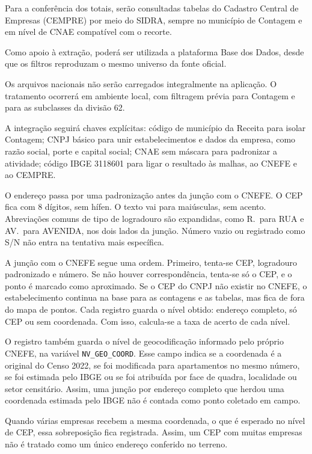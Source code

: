 Para a conferência dos totais, serão consultadas tabelas do Cadastro Central de Empresas (CEMPRE) por meio do SIDRA, sempre no município de Contagem e em nível de CNAE compatível com o recorte.

Como apoio à extração, poderá ser utilizada a plataforma Base dos Dados, desde que os filtros reproduzam o mesmo universo da fonte oficial.

Os arquivos nacionais não serão carregados integralmente na aplicação.
O tratamento ocorrerá em ambiente local, com filtragem prévia para Contagem e para as subclasses da divisão 62.

A integração seguirá chaves explícitas: código de município da Receita para isolar Contagem; CNPJ básico para unir estabelecimentos e dados da empresa, como razão social, porte e capital social; CNAE sem máscara para padronizar a atividade; código IBGE 3118601 para ligar o resultado às malhas, ao CNEFE e ao CEMPRE.

O endereço passa por uma padronização antes da junção com o CNEFE.
O CEP fica com 8 dígitos, sem hífen.
O texto vai para maiúsculas, sem acento.
Abreviações comuns de tipo de logradouro são expandidas, como R.\ para RUA e AV.\ para AVENIDA, nos dois lados da junção.
Número vazio ou registrado como S/N não entra na tentativa mais específica.

A junção com o CNEFE segue uma ordem.
Primeiro, tenta-se CEP, logradouro padronizado e número.
Se não houver correspondência, tenta-se só o CEP, e o ponto é marcado como aproximado.
Se o CEP do CNPJ não existir no CNEFE, o estabelecimento continua na base para as contagens e as tabelas, mas fica de fora do mapa de pontos.
Cada registro guarda o nível obtido: endereço completo, só CEP ou sem coordenada.
Com isso, calcula-se a taxa de acerto de cada nível.

O registro também guarda o nível de geocodificação informado pelo próprio CNEFE, na variável \texttt{NV\_GEO\_COORD}.
Esse campo indica se a coordenada é a original do Censo 2022, se foi modificada para apartamentos no mesmo número, se foi estimada pelo IBGE ou se foi atribuída por face de quadra, localidade ou setor censitário.
Assim, uma junção por endereço completo que herdou uma coordenada estimada pelo IBGE não é contada como ponto coletado em campo.

Quando várias empresas recebem a mesma coordenada, o que é esperado no nível de CEP, essa sobreposição fica registrada.
Assim, um CEP com muitas empresas não é tratado como um único endereço conferido no terreno.

